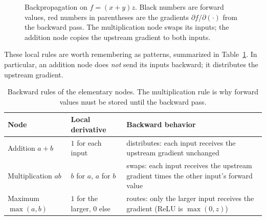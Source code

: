\begin{figure}[ht]
  \centering
  \caption{Backpropagation on $f=(x+y)z$. Black numbers are forward values,
  red numbers in parentheses are the gradients $\partial f/\partial(\cdot)$ from
  the backward pass. The multiplication node swaps its inputs; the addition node copies the
  upstream gradient to both inputs.}
  \label{fig:backprop-graph}
\end{figure}

\noindent
These local rules are worth remembering as patterns, summarized in
Table~\ref{tab:gate-rules}. In particular, an addition node does \emph{not} send
its inputs backward; it distributes the upstream gradient.

\begin{table}[ht]
  \centering
  \begin{tabular}{@{}p{2.4cm}p{3.6cm}p{7.2cm}@{}}
    \toprule
    Node & Local derivative & Backward behavior \\
    \midrule
    Addition $a+b$ & $1$ for each input & distributes: each input receives the
      upstream gradient unchanged \\
    Multiplication $ab$ & $b$ for $a$, $a$ for $b$ & swaps: each input receives
      the upstream gradient times the other input's forward value \\
    Maximum $\max(a,b)$ & $1$ for the larger, $0$ else & routes: only the larger
      input receives the gradient (ReLU is $\max(0,z)$) \\
    \bottomrule
  \end{tabular}
  \caption{Backward rules of the elementary nodes. The multiplication rule is
  why forward values must be stored until the backward pass.}
  \label{tab:gate-rules}
\end{table}

